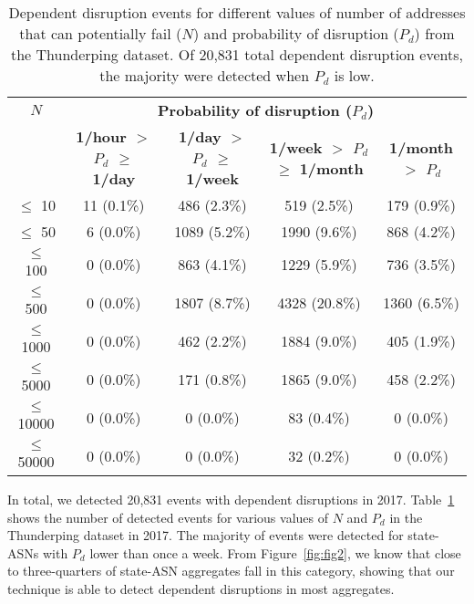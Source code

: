 \begin{table}[th]
  \centering
  \hspace{-0.04in}\tiny
  \begin{tabular}{c|c|c|c|c|}
\textbf{$N$} & \multicolumn{4}{c|}{\textbf{Probability of disruption ($P_d$)}} \\
    & \textbf{ 1/hour $>$ $P_d$ $\geq$ 1/day} & \textbf{1/day $>$
      $P_d$ $\geq$ 1/week} & \textbf{1/week $>$ $P_d$ $\geq$ 1/month} &
    \textbf{1/month $>$ $P_d$} \\
    \hline
$\leq$ 10 & 11 (0.1\%) & 486 (2.3\%) & 519 (2.5\%) & 179 (0.9\%) \\
$\leq$ 50 & 6 (0.0\%) & 1089 (5.2\%) & 1990 (9.6\%) & 868 (4.2\%) \\
$\leq$ 100 & 0 (0.0\%) & 863 (4.1\%) & 1229 (5.9\%) & 736 (3.5\%) \\
$\leq$ 500 & 0 (0.0\%) & 1807 (8.7\%) & 4328 (20.8\%) & 1360 (6.5\%) \\
$\leq$ 1000 & 0 (0.0\%) & 462 (2.2\%) & 1884 (9.0\%) & 405 (1.9\%) \\
$\leq$ 5000 & 0 (0.0\%) & 171 (0.8\%) & 1865 (9.0\%) & 458 (2.2\%) \\
$\leq$ 10000 & 0 (0.0\%) & 0 (0.0\%) & 83 (0.4\%) & 0 (0.0\%) \\
$\leq$ 50000 & 0 (0.0\%) & 0 (0.0\%) & 32 (0.2\%) & 0 (0.0\%) \\
    \end{tabular}
  \caption[Dependent disruption
events for different values of number of addresses that can
potentially fail ($N$) and probability of disruption ($P_d$) from the
Thunderping dataset]{\label{tbl:events_per_nup_and_fprob} Dependent disruption
events for different values of number of addresses that can
potentially fail ($N$) and probability of disruption ($P_d$) from the
Thunderping dataset. Of 20,831 total dependent disruption
events, the majority were detected when $P_d$ is low.
  }
\end{table}

In total, we detected 20,831 events with dependent disruptions in
2017. Table~\ref{tbl:events_per_nup_and_fprob} shows the number of
detected events for various values of $N$ and $P_d$ in the Thunderping dataset
in 2017. The majority of events were detected for state-ASNs with
$P_d$ lower than once a week. From Figure~\ref{fig:fig2}, we know that
close to three-quarters of state-ASN aggregates fall in this
category, showing that our technique is able to detect dependent
disruptions in most aggregates.

